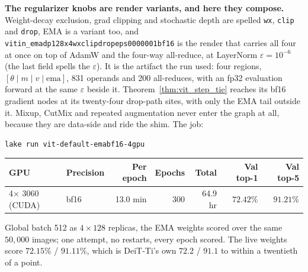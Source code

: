 \medskip\noindent\textbf{The regularizer knobs are render variants, and
here they compose.} Weight-decay exclusion, grad clipping and stochastic
depth are spelled \texttt{wx}, \texttt{clip} and \texttt{drop}, EMA is a
variant too, and \texttt{vitin\_\allowbreak emadp128x4\allowbreak wxclipdrop\allowbreak eps0000001bf16}
is the render that carries all four at once on top of AdamW and the
four-way all-reduce, at LayerNorm $\varepsilon = 10^{-6}$ (the last
field spells the $\varepsilon$). It is the artifact the run used: four
regions, $[\theta \mid m \mid v \mid \mathrm{ema}]$, 831 operands and
200 all-reduces, with an fp32 evaluation forward at the same
$\varepsilon$ beside it.
Theorem~\ref{thm:vit_step_tie} reaches its bf16 gradient nodes at its
twenty-four drop-path sites, with only the EMA tail outside it. Mixup,
CutMix and repeated
augmentation never enter the graph at all, because they are data-side
and ride the shim. The job:

\begin{verbatim}
lake run vit-default-emabf16-4gpu
\end{verbatim}

\begin{center}
\begin{tabular}{l l r r r r r}
\hline
GPU & Precision & Per epoch & Epochs & Total & Val top-1 & Val top-5 \\
\hline
4$\times$ 3060 (CUDA) & bf16 & 13.0 min & 300 & 64.9 hr & $\mathbf{72.42\%}$ & $\mathbf{91.21\%}$ \\
\hline
\end{tabular}
\end{center}

\noindent Global batch 512 as $4 \times 128$ replicas, the EMA weights
scored over the same $50{,}000$ images; one attempt, no restarts, every
epoch scored. The live weights score $72.15\%$ / $91.11\%$, which is
DeiT-Ti's own $72.2$ / $91.1$ to within a twentieth of a point.


